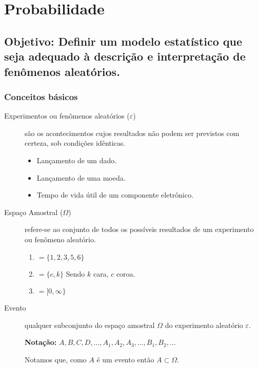 \chapter{Probabilidade}

\section*{Objetivo: Definir um modelo estatístico que seja adequado à descrição e interpretação de fenômenos aleatórios.}

\subsection{Conceitos básicos}

\begin{description}

  \item[Experimentos ou fenômenos aleatórios ($\varepsilon$)] são os acontecimentos cujos resultados não podem ser previstos 
    com certeza, sob condições idênticas.

    \begin{example}
        \begin{itemize}
          \item Lançamento de um dado.
          \item Lançamento de uma moeda.
          \item Tempo de vida útil de um componente eletrônico.
        \end{itemize}
      \end{example}
  \item [Espaço Amostral ($\Omega$)] refere-se ao conjunto de todos os possíveis resultados de um experimento ou fenômeno 
    aleatório.
    \begin{example}
        \begin{enumerate}[label=$\Omega_{\arabic*}$]
          \item $= \{ 1,2,3,5,6 \}$ 
          \item $= \{ c,k \}$ Sendo $k$ cara, $c$ coroa.
        \item $= [ 0,\infty \}$ 
      \end{enumerate}
    \end{example}
\item [Evento] qualquer subconjunto do espaço amostral $\Omega$ do experimento aleatório $\varepsilon$.

  \textbf{Notação:} $A,B,C,D,\dots,A_1,A_2,A_3,\dots,B_1,B_2,\dots$

    Notamos que, como $A$ é um evento então $A \subset \Omega$.


\end{description}
